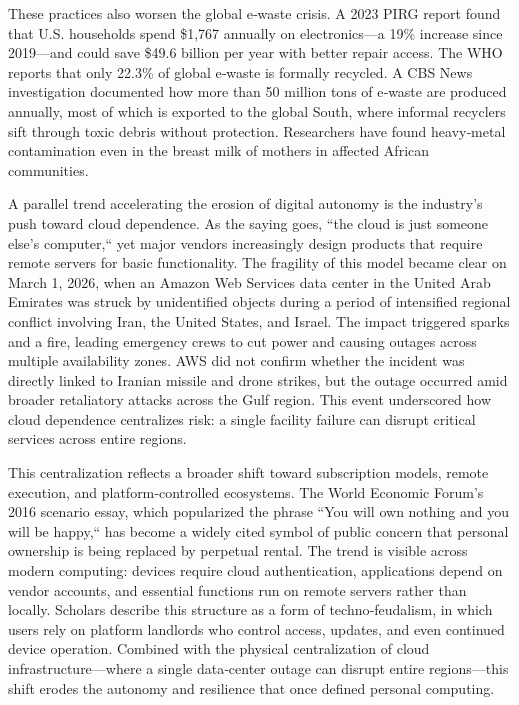 These practices also worsen the global e‑waste crisis. A 2023 PIRG report found that U.S. households spend \$1,767 annually on electronics—a 19\% increase since 2019—and could save \$49.6 billion per year with better repair access. The WHO reports that only 22.3\% of global e‑waste is formally recycled. A CBS News investigation\cite{cbsEwasteTragicCosts} documented how more than 50 million tons of e‑waste are produced annually, most of which is exported to the global South, where informal recyclers sift through toxic debris without protection. Researchers have found heavy‑metal contamination even in the breast milk of mothers in affected African communities.

A parallel trend accelerating the erosion of digital autonomy is the industry's push toward cloud dependence. As the saying goes, ``the cloud is just someone else's computer,``\cite{win11mustbestopped} yet major vendors increasingly design products that require remote servers for basic functionality. The fragility of this model became clear on March 1, 2026, when an Amazon Web Services data center in the United Arab Emirates was struck by unidentified objects during a period of intensified regional conflict involving Iran, the United States, and Israel. The impact triggered sparks and a fire, leading emergency crews to cut power and causing outages across multiple availability zones. AWS did not confirm whether the incident was directly linked to Iranian missile and drone strikes, but the outage occurred amid broader retaliatory attacks across the Gulf region. This event underscored how cloud dependence centralizes risk: a single facility failure can disrupt critical services across entire regions.

This centralization reflects a broader shift toward subscription models, remote execution, and platform‑controlled ecosystems. The World Economic Forum’s 2016 scenario essay, which popularized the phrase ``You will own nothing and you will be happy,``\cite{ownnothingbehappy} has become a widely cited symbol of public concern that personal ownership is being replaced by perpetual rental. The trend is visible across modern computing: devices require cloud authentication, applications depend on vendor accounts, and essential functions run on remote servers rather than locally. Scholars describe this structure as a form of techno‑feudalism, in which users rely on platform landlords who control access, updates, and even continued device operation. Combined with the physical centralization of cloud infrastructure—where a single data‑center outage can disrupt entire regions—this shift erodes the autonomy and resilience that once defined personal computing.

